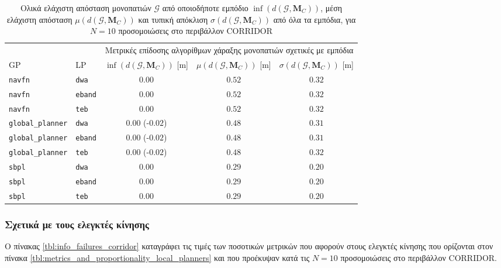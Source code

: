 \begin{table}[h]\hspace{-1cm}
\renewcommand{\arraystretch}{1.3}
\begin{tabular}{llccc}
  & & \multicolumn{3}{c}{Μετρικές επίδοσης αλγορίθμων χάραξης μονοπατιών σχετικές με εμπόδια} \\
  \cline{3-5}
  GP & LP & $\inf(d(\bm{\mathcal{G}},\bm{M}_C))$ [m] & $\mu(d(\bm{\mathcal{G}}, \bm{M}_C))$ [m] & $\sigma(d(\bm{\mathcal{G}},\bm{M}_C))$ [m] \\ \toprule
  \texttt{navfn} & \texttt{dwa} & $0.00$ & $0.52$ & $0.32$ \\
  \texttt{navfn} & \texttt{eband} & $0.00$ & $0.52$ & $0.32$ \\
  \texttt{navfn} & \texttt{teb} & $0.00$ & $0.52$ & $0.32$ \\
  \texttt{global\_planner} & \texttt{dwa} & \hspace{1.1cm} $0.00$ (-$0.02$) & $0.48$ & $0.31$ \\
  \texttt{global\_planner} & \texttt{eband} & \hspace{1.1cm} $0.00$ (-$0.02$) & $0.48$ & $0.31$ \\
  \texttt{global\_planner} & \texttt{teb} & \hspace{1.1cm} $0.00$ (-$0.02$) & $0.48$ & $0.32$ \\
  \texttt{sbpl} & \texttt{dwa} & $0.00$ & $0.29$ & $0.20$ \\
  \texttt{sbpl} & \texttt{eband} & $0.00$ & $0.29$ & $0.20$ \\
  \texttt{sbpl} & \texttt{teb} & $0.00$ & $0.29$ & $0.20$ \\ \bottomrule
\end{tabular}
\caption{\small Ολικά ελάχιστη απόσταση μονοπατιών $\bm{\mathcal{G}}$ από
         οποιοδήποτε εμπόδιο $\inf(d(\bm{\mathcal{G}},\bm{M}_C))$, μέση
         ελάχιστη απόσταση $\mu(d(\bm{\mathcal{G}},\bm{M}_C))$ και τυπική
         απόκλιση $\sigma(d(\bm{\mathcal{G}},\bm{M}_C))$ από όλα τα εμπόδια,
         για $N=10$ προσομοιώσεις στο περιβάλλον CORRIDOR}
\label{tbl:info_global_plan_map_corridor}
\end{table}

\subsubsection{Σχετικά με τους ελεγκτές κίνησης}

O πίνακας \ref{tbl:info_failures_corridor} καταγράφει τις τιμές των ποσοτικών
μετρικών που αφορούν στους ελεγκτές κίνησης που ορίζονται στον πίνακα
\ref{tbl:metrics_and_proportionality_local_planners} και που προέκυψαν κατά τις
$N = 10$ προσομοιώσεις στο περιβάλλον CORRIDOR.

